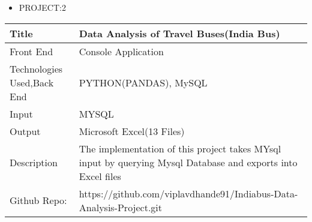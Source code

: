 \documentclass[a4paper,10pt]{article}
\begin{document}
 
 
 
\vspace{10mm}

 
 \renewcommand{\labelitemi}{$\blacksquare$}
 
 
 \begin{itemize}
   \item {\large PROJECT:2}
   
 \end{itemize}


\begin{tabu} to 0.9\textwidth { | X[l] | X[2.5] | }
 \hline
 \large Title & Data Analysis of Travel Buses(India Bus)\\
 
 \hline
\large Front End  & Console Application\\
 

 \hline
 \large Technologies Used,Back End    & PYTHON(PANDAS), MySQL \\
 
 \hline
\large Input  & MYSQL   \\


\hline
\large Output  & Microsoft Excel(13 Files)   \\
 
 \hline
\large Description & The implementation of this project takes MYsql input by querying Mysql Database and exports into Excel files \\


\hline
\large Github Repo: & https://github.com/viplavdhande91/Indiabus-Data-Analysis-Project.git \\
 
 
\hline
 

 
\hline
\end{tabu}
 
 
 
 
 
 
 
 
 
 
 
 
 
 
 
 
 
 
 
 
 
 
 
 
 
 
 
 
 
 
 
\end{document}
